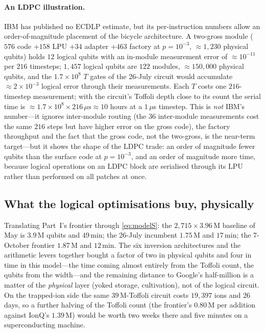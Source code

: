 \paragraph{An LDPC illustration.} IBM has published no ECDLP estimate, but its per-instruction numbers \cite{yoder25tour} allow an order-of-magnitude placement of the bicycle architecture. A two-gross module ($576$ code $+158$ LPU $+34$ adapter $+463$ factory at $p=10^{-3}$, $\approx1{,}230$ physical qubits) holds $12$ logical qubits with an in-module measurement error of $\approx10^{-11}$ per $216$ timesteps; $1{,}457$ logical qubits are $122$ modules, $\approx150{,}000$ physical qubits, and the $1.7\times10^8$ $T$ gates of the 26-July circuit would accumulate $\approx2\times10^{-3}$ logical error through their measurements. Each $T$ costs one $216$-timestep measurement; with the circuit's Toffoli depth close to its count the serial time is $\approx1.7\times10^8\times216\,\mu\mathrm{s}\approx10$ hours at a $1\,\mu$s timestep. This is \emph{not} IBM's number---it ignores inter-module routing (the $36$ inter-module measurements cost the same $216$ steps but have higher error on the gross code), the factory throughput and the fact that the gross code, not the two-gross, is the near-term target---but it shows the shape of the LDPC trade: an order of magnitude fewer qubits than the surface code at $p=10^{-3}$, and an order of magnitude more time, because logical operations on an LDPC block are serialised through its LPU rather than performed on all patches at once.

\subsection{What the logical optimisations buy, physically}
Translating Part~I's frontier through \cref{eq:modelS}: the $2{,}715\times3.96$\,M baseline of May is $3.9$\,M qubits and $49$\,min; the 26-July incumbent $1.75$\,M and $17$\,min; the 7-October frontier $1.87$\,M and $12$\,min. The six inversion architectures and the arithmetic levers together bought a factor of two in physical qubits and four in time in this model---the time coming almost entirely from the Toffoli count, the qubits from the width---and the remaining distance to Google's half-million is a matter of the \emph{physical} layer (yoked storage, cultivation), not of the logical circuit. On the trapped-ion side the same $39$\,M-Toffoli circuit costs $19{,}397$ ions and $26$ days, so a further halving of the Toffoli count (the frontier's $0.80$\,M per addition against IonQ's $1.39$\,M) would be worth two weeks there and five minutes on a superconducting machine.
